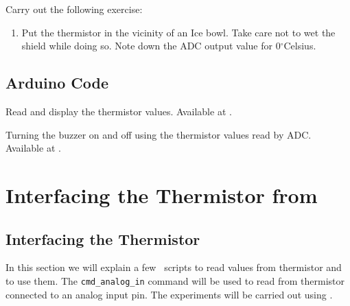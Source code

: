 \begin{exercise}
Carry out the following exercise:
\begin{enumerate}
\item Put the thermistor in the vicinity of an Ice bowl. Take care not
  to wet the shield while doing so. Note down the ADC output value for
  0$^{\circ}$Celsius. 
\end{enumerate}
\end{exercise}

\subsection{Arduino Code}
\label{sec:therm-arduino-code}

\begin{ardcode}
   {Read and display
    the thermistor values.  Available at
    .}
\label{ard:therm-read}

\end{ardcode}

\begin{ardcode}
  {Turning the buzzer on and off using the thermistor values read by
    ADC.  Available at
    .}
\label{ard:therm-buzzer}

\end{ardcode}

\section{Interfacing the Thermistor from \scilab}
\subsection{Interfacing the Thermistor}
In this section we will explain a few \scilab\ scripts to read values
from thermistor and to use them.  The {\tt cmd\_analog\_in} command
will be used to read from thermistor connected to an analog input
pin. The experiments will be carried out using \scilab.

